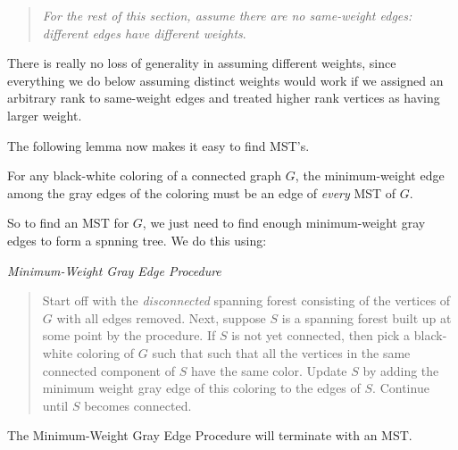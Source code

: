 \begin{quote}
\emph{For the rest of this section, assume there are no same-weight
  edges: different edges have different weights}.
\end{quote}

There is really no loss of generality in assuming different weights,
since everything we do below assuming distinct weights would work if
we assigned an arbitrary rank to same-weight edges and treated higher
rank vertices as having larger weight.

The following lemma now makes it easy to find MST's.

\begin{lemma}\label{lem:necessary-gray}
For any black-white coloring of a connected graph $G$, the
minimum-weight edge among the gray edges of the coloring must be an
edge of \emph{every} MST of $G$.
\end{lemma}

So to find an MST for $G$, we just need to find enough minimum-weight
gray edges to form a spnning tree.  We do this using:

\begin{center}
{\large \emph{Minimum-Weight Gray Edge Procedure}}
\end{center}

\begin{quote}
Start off with the \emph{disconnected} spanning forest consisting of
the vertices of $G$ with all edges removed.  Next, suppose $S$ is a
spanning forest built up at some point by the procedure.  If $S$ is
not yet connected, then pick a black-white coloring of $G$ such that
such that all the vertices in the same connected component of $S$ have
the same color.  Update $S$ by adding the minimum weight gray edge of
this coloring to the edges of $S$.  Continue until $S$ becomes
connected.
\end{quote}

\begin{theorem}
The Minimum-Weight Gray Edge Procedure will terminate with an MST.
\end{theorem}

